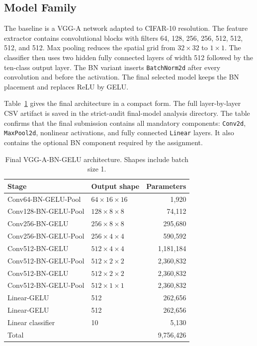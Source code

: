 \documentclass[10pt,twocolumn]{article}
\begin{document}
\subsection{Model Family}
The baseline is a VGG-A network adapted to CIFAR-10 resolution. The feature extractor contains convolutional blocks with filters 64, 128, 256, 256, 512, 512, 512, and 512. Max pooling reduces the spatial grid from $32\times32$ to $1\times1$. The classifier then uses two hidden fully connected layers of width 512 followed by the ten-class output layer. The BN variant inserts \texttt{BatchNorm2d} after every convolution and before the activation. The final selected model keeps the BN placement and replaces ReLU by GELU.

Table~\ref{tab:arch} gives the final architecture in a compact form. The full layer-by-layer CSV artifact is saved in the strict-audit final-model analysis directory. The table confirms that the final submission contains all mandatory components: \texttt{Conv2d}, \texttt{MaxPool2d}, nonlinear activations, and fully connected \texttt{Linear} layers. It also contains the optional BN component required by the assignment.

\begin{table}[t]
\centering
\caption{Final VGG-A-BN-GELU architecture. Shapes include batch size 1.}
\label{tab:arch}
\scriptsize
\begin{tabular}{llr}
\toprule
Stage & Output shape & Parameters\\
\midrule
Conv64-BN-GELU-Pool & $64\times16\times16$ & 1,920\\
Conv128-BN-GELU-Pool & $128\times8\times8$ & 74,112\\
Conv256-BN-GELU & $256\times8\times8$ & 295,680\\
Conv256-BN-GELU-Pool & $256\times4\times4$ & 590,592\\
Conv512-BN-GELU & $512\times4\times4$ & 1,181,184\\
Conv512-BN-GELU-Pool & $512\times2\times2$ & 2,360,832\\
Conv512-BN-GELU & $512\times2\times2$ & 2,360,832\\
Conv512-BN-GELU-Pool & $512\times1\times1$ & 2,360,832\\
Linear-GELU & 512 & 262,656\\
Linear-GELU & 512 & 262,656\\
Linear classifier & 10 & 5,130\\
\midrule
Total &  & 9,756,426\\
\bottomrule
\end{tabular}
\end{table}
\end{document}
